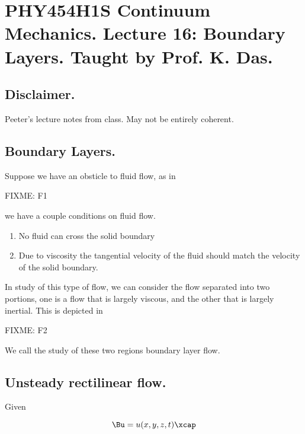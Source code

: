 
%

\chapter{PHY454H1S Continuum Mechanics.  Lecture 16: Boundary Layers.  Taught by Prof. K. Das.}
\label{chap:continuumL16}
{}
\date{Mar 14, 2012}

\beginArtWithToc

\section{Disclaimer.}

Peeter's lecture notes from class.  May not be entirely coherent.

\section{Boundary Layers.}

Suppose we have an obsticle to fluid flow, as in

FIXME: F1

we have a couple conditions on fluid flow.

\begin{enumerate}
\item No fluid can cross the solid boundary
\item Due to viscosity the tangential velocity of the fluid should match the velocity of the solid boundary.
\end{enumerate}

In study of this type of flow, we can consider the flow separated into two portions, one is a flow that is largely viscous, and the other that is largely inertial.  This is depicted in 

FIXME: F2

We call the study of these two regions boundary layer flow.

\section{Unsteady rectilinear flow.}

Given

\begin{equation}\label{eqn:continuumL16:10}
\Bu = u(x, y, z, t) \xcap
\end{equation}

